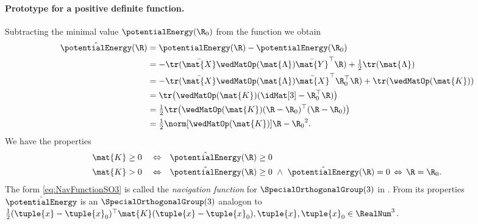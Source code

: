 \paragraph{Prototype for a positive definite function.}
Subtracting the minimal value $\potentialEnergy(\R_0)$ from the function we obtain
\begin{subequations}
\begin{align}
 \hat{\potentialEnergy}(\R) &= \potentialEnergy(\R) - \potentialEnergy(\R_0)
\nonumber\\
 &= -\tr(\bar{\mat{X}} \wedMatOp(\mat{\Lambda}) \bar{\mat{Y}}^\top \R) + \tfrac{1}{2}\tr(\mat{\Lambda})
\nonumber\\
 &= -\tr(\bar{\mat{X}} \wedMatOp(\mat{\Lambda}) \bar{\mat{X}}^\top \R_0^\top \R) + \tr(\wedMatOp(\mat{K}))
\nonumber\\
\label{eq:NavFunctionSO3}
 &= \tr\big(\wedMatOp(\mat{K})(\idMat[3] - \R_0^\top \R)\big)
\\
 &= \tfrac{1}{2} \tr\big(\wedMatOp(\mat{K})(\R - \R_0)^\top (\R - \R_0)\big)
\nonumber\\
 &= \tfrac{1}{2}\norm[\wedMatOp(\mat{K})]{\R-\R_0}^2.
\end{align}
\end{subequations}
We have the properties
\begin{subequations}
\begin{align}
 \mat{K} &\geq 0& 
 &\Leftrightarrow&
 \hat{\potentialEnergy}(\R) &\geq 0
\\
 \mat{K} &> 0& 
 &\Leftrightarrow&
 \hat{\potentialEnergy}(\R) &\geq 0 \ \wedge \ \hat{\potentialEnergy}(\R) = 0 \, \Leftrightarrow \, \R = \R_0.
\end{align}
\end{subequations}
The form \eqref{eq:NavFunctionSO3} is called the \textit{navigation function} for $\SpecialOrthogonalGroup(3)$ in \cite{Koditschek:TotalEnergy}.
From its properties $\hat{\potentialEnergy}$ is an $\SpecialOrthogonalGroup(3)$ analogon to $\tfrac{1}{2}(\tuple{x}-\tuple{x}_0)^\top\mat{K}(\tuple{x}-\tuple{x}_0), \tuple{x},\tuple{x}_0\in\RealNum^3$.
